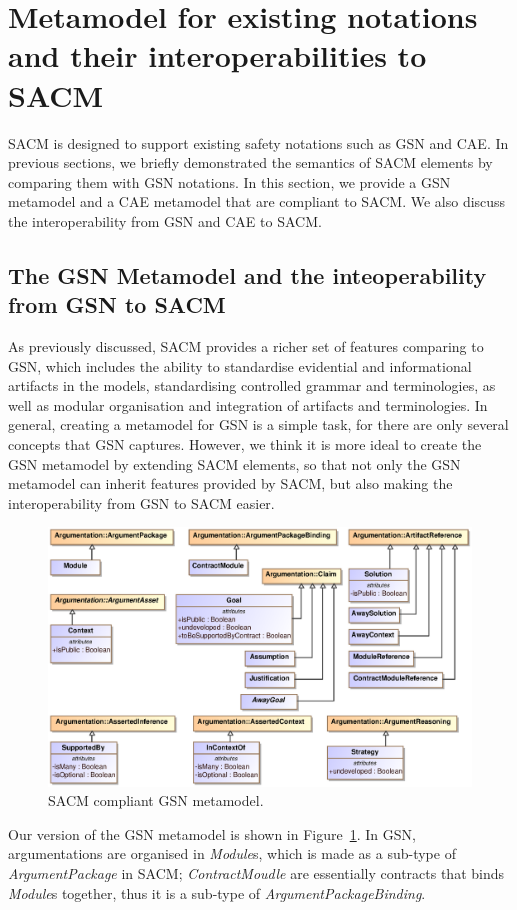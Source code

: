 \section{Metamodel for  existing notations and their interoperabilities to SACM}
\label{sec:mapping}
SACM is designed to support existing safety notations such as GSN and CAE. In previous sections, we briefly demonstrated the semantics of SACM elements by comparing them with GSN notations. In this section, we provide a GSN metamodel and a CAE metamodel that are compliant to SACM. We also discuss the interoperability from GSN and CAE to SACM.

\subsection{The GSN Metamodel and the inteoperability from GSN to SACM}
As previously discussed, SACM provides a richer set of features comparing to GSN, which includes the ability to standardise evidential and informational artifacts in the models, standardising controlled grammar and terminologies, as well as modular organisation and integration of artifacts and terminologies. In general, creating a metamodel for GSN is a simple task, for there are only several concepts that GSN captures. However, we think it is more ideal to create the GSN metamodel by extending SACM elements, so that not only the GSN metamodel can inherit features provided by SACM, but also making the interoperability from GSN to SACM easier. 
\begin{figure}
	\centering
	\includegraphics[width=1\linewidth]{GSN.eps}
	\caption{SACM compliant GSN metamodel.}
	\label{fig:gsnMetamodel}
\end{figure}

Our version of the GSN metamodel is shown in Figure~\ref{fig:gsnMetamodel}. In GSN, argumentations are organised in \textit{Module}s, which is made as a sub-type of \textit{ArgumentPackage} in SACM; \textit{ContractMoudle} are essentially contracts that binds \textit{Module}s together, thus it is a sub-type of \textit{ArgumentPackageBinding}. 

